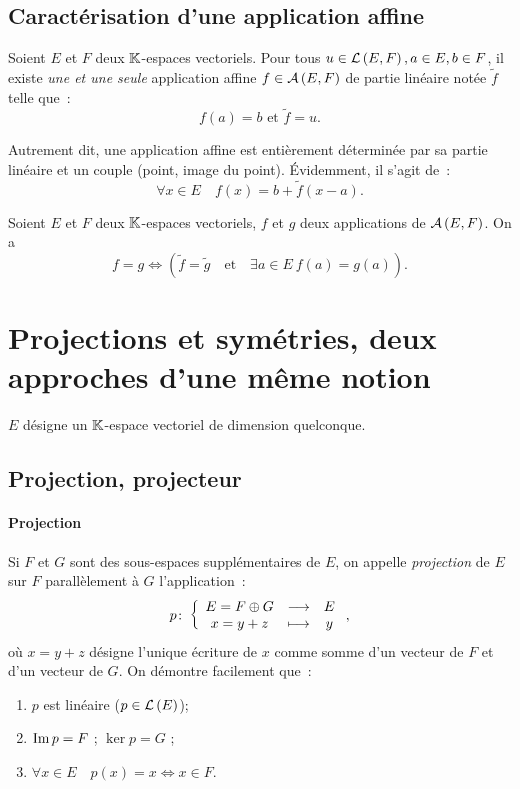 \subsection{Caractérisation d'une application affine}
\begin{theo}
	Soient $E$ et $F$ deux $\mathbb{K}$-espaces vectoriels. Pour tous $u \in \mathcal{L}\left(E,F\right), a \in E, b \in F$, il existe \emph{une et une seule} application affine $f \in \mathcal{A}\left(E,F\right)$ de partie linéaire notée $\tilde{f}$ telle que~:
	\begin{equation}
		f(a)=b \text{ et } \tilde{f}=u.
	\end{equation}
\end{theo}
Autrement dit, une application affine est entièrement déterminée par sa partie linéaire et un couple (point, image du point). Évidemment, il s'agit de~:
\begin{equation}
	\forall x \in E \quad f(x)=b+\tilde{f}(x-a).
\end{equation}
\begin{corth}
	Soient $E$ et $F$ deux $\mathbb{K}$-espaces vectoriels, $f$ et $g$ deux applications de $\mathcal{A}\left(E,F\right)$. On a 
	\begin{equation}
		f = g \iff (\tilde{f} = \tilde{g} \quad \text{et} \quad \exists a \in E \ f(a)=g(a)).
	\end{equation}
\end{corth}
\section[Projections et symétries]{Projections et symétries, deux approches d'une même notion}
\label{chap0-sec:projection}
$E$ désigne un $\mathbb{K}$-espace vectoriel de dimension quelconque.
\subsection{Projection, projecteur}
\label{chap0-subsec:projectionprojecteur}
\paragraph{Projection}
Si $F$ et $G$ sont des sous-espaces supplémentaires de $E$, on appelle \emph{projection} de $E$ sur $F$ parallèlement à $G$ l'application~:
\begin{equation}
	p\colon \left\{\begin{array}{ccc} E = F \oplus G & \longrightarrow &E\\ x=y+z & \longmapsto & y \end{array} \right.,
\end{equation}
où $x=y+z$ désigne l'unique écriture de $x$ comme somme d'un vecteur de $F$ et d'un vecteur de $G$. On démontre facilement que~:
\begin{enumerate}
	\item $p$ est linéaire ($p \in \mathcal{L}\left(E\right)$);
	\item $\operatorname{Im}{p} = F$ ; $\ker{p} = G$ ;
	\item $\forall x \in E \quad p(x)=x \iff x \in F$.
\end{enumerate}
